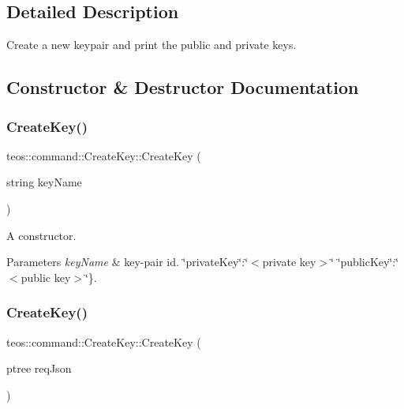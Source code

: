 \subsection{Detailed Description}
Create a new keypair and print the public and private keys. 

\subsection{Constructor \& Destructor Documentation}
\mbox{\label{classteos_1_1command_1_1_create_key_a9908b3b01b818ccd742978a0b74c9745}} 
\subsubsection{\texorpdfstring{Create\+Key()}{CreateKey()}\hspace{0.1cm}{\footnotesize\ttfamily [1/2]}}
{\footnotesize\ttfamily teos\+::command\+::\+Create\+Key\+::\+Create\+Key (\begin{DoxyParamCaption}\item[{string}]{key\+Name }\end{DoxyParamCaption})\hspace{0.3cm}{\ttfamily [inline]}}



A constructor. 


\begin{DoxyParams}{Parameters}
{\em key\+Name} & key-\/pair id. \char`\"{}private\+Key\char`\"{}\+:\char`\"{}$<$private key$>$\char`\"{} \char`\"{}public\+Key\char`\"{}\+:\char`\"{}$<$public key$>$\char`\"{}\}. \\
\hline
\end{DoxyParams}
\mbox{\label{classteos_1_1command_1_1_create_key_a9e09786f8c0cef5e37d041567627e9fd}} 
\subsubsection{\texorpdfstring{Create\+Key()}{CreateKey()}\hspace{0.1cm}{\footnotesize\ttfamily [2/2]}}
{\footnotesize\ttfamily teos\+::command\+::\+Create\+Key\+::\+Create\+Key (\begin{DoxyParamCaption}\item[{ptree}]{req\+Json }\end{DoxyParamCaption})\hspace{0.3cm}{\ttfamily [inline]}}



